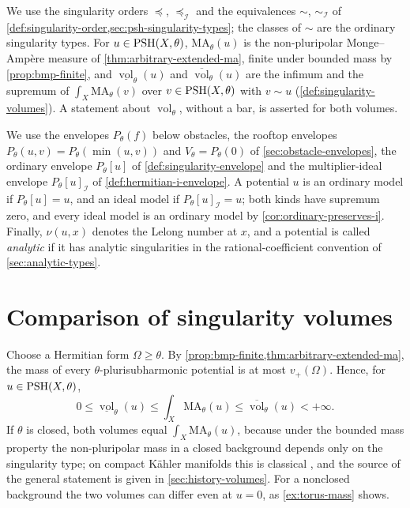 We use the singularity orders $\preceq$, $\preceq_{\mathcal I}$ and the equivalences $\sim$, $\sim_{\mathcal I}$ of \cref{def:singularity-order,sec:psh-singularity-types}; the classes of $\sim$ are the ordinary singularity types. For $u\in\mathrm{PSH}(X,\theta)$, $\mathrm{MA}_\theta(u)$ is the non-pluripolar Monge--Amp\`ere measure of \cref{thm:arbitrary-extended-ma}, finite under bounded mass by \cref{prop:bmp-finite}, and $\underline{\operatorname{vol}}_\theta(u)$ and $\overline{\operatorname{vol}}_\theta(u)$ are the infimum and the supremum of $\int_X\mathrm{MA}_\theta(v)$ over $v\in\mathrm{PSH}(X,\theta)$ with $v\sim u$ (\cref{def:singularity-volumes}). A statement about $\operatorname{vol}_\theta$, without a bar, is asserted for both volumes.

We use the envelopes $P_\theta(f)$ below obstacles, the rooftop envelopes $P_\theta(u,v)=P_\theta(\min(u,v))$ and $V_\theta=P_\theta(0)$ of \cref{sec:obstacle-envelopes}, the ordinary envelope $P_\theta[u]$ of \cref{def:singularity-envelope} and the multiplier-ideal envelope $P_\theta[u]_{\mathcal I}$ of \cref{def:hermitian-i-envelope}. A potential $u$ is an ordinary model if $P_\theta[u]=u$, and an ideal model if $P_\theta[u]_{\mathcal I}=u$; both kinds have supremum zero, and every ideal model is an ordinary model by \cref{cor:ordinary-preserves-i}. Finally, $\nu(u,x)$ denotes the Lelong number at $x$, and a potential is called \emph{analytic} if it has analytic singularities in the rational-coefficient convention of \cref{sec:analytic-types}.

\section{Comparison of singularity volumes}
\label{sec:bounded-mass-volume-comparison}

Choose a Hermitian form $\Omega\geq\theta$. By \cref{prop:bmp-finite,thm:arbitrary-extended-ma}, the mass of every $\theta$-plurisubharmonic potential is at most $v_+(\Omega)$. Hence, for $u\in\mathrm{PSH}(X,\theta)$,
\[
 0\leq\underline{\operatorname{vol}}_\theta(u)
 \leq\int_X\mathrm{MA}_\theta(u)
 \leq\overline{\operatorname{vol}}_\theta(u)<+\infty.
\]
If $\theta$ is closed, both volumes equal $\int_X\mathrm{MA}_\theta(u)$, because under the bounded mass property the non-pluripolar mass in a closed background depends only on the singularity type; on compact K\"ahler manifolds this is classical \cite{SGPT}, and the source of the general statement is given in \cref{sec:history-volumes}. For a nonclosed background the two volumes can differ even at $u=0$, as \cref{ex:torus-mass} shows.

